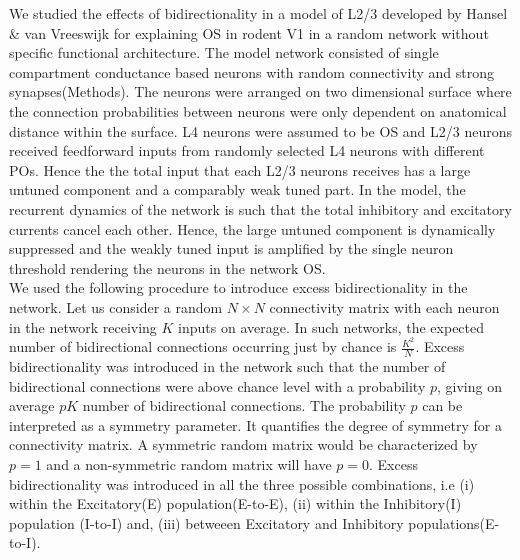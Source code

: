 We studied the effects of bidirectionality in a model of L2/3 developed by Hansel \& van Vreeswijk\cite{Hansel2012} for explaining OS in rodent V1 in a random network without specific functional architecture. The model network consisted of single compartment conductance based neurons with random connectivity and strong synapses(Methods). The neurons were arranged on two dimensional surface where the connection probabilities between neurons were only dependent on anatomical distance within the surface. L4 neurons were assumed to be OS and L2/3 neurons received feedforward inputs from randomly selected L4 neurons with different POs. Hence the the total input that each L2/3 neurons receives has a large untuned component and a comparably weak tuned part. In the model, the recurrent dynamics of the network is such that the total inhibitory and excitatory currents cancel each other. Hence, the large untuned component is dynamically suppressed and the weakly tuned input is amplified by the single neuron threshold rendering the neurons in the network OS. \\
We used the following procedure to introduce excess bidirectionality in the network. Let us consider a random $N \times N$ connectivity matrix with each neuron in the network receiving $K$ inputs on average. In such networks, the expected number of bidirectional connections occurring just by chance is $\frac{K^2}{N}$. Excess bidirectionality was introduced in the network such that the number of bidirectional connections were above chance level with a probability $p$, giving on average $pK$ number of bidirectional connections. The probability $p$ can be interpreted as a symmetry parameter. It quantifies the degree of symmetry for a connectivity matrix. A symmetric random matrix would be characterized by $p = 1$ and a non-symmetric random matrix will have $p = 0$. %
Excess bidirectionality was introduced in all the three possible combinations, i.e (i) within the Excitatory(E) population(E-to-E), (ii) within the Inhibitory(I) population (I-to-I) and, (iii) betweeen Excitatory and Inhibitory populations(E-to-I). \\

